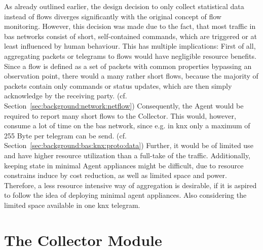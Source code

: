 As already outlined earlier, the design decision to only collect statistical data instead of flows diverges significantly with the original concept of flow monitoring.
However, this decision was made due to the fact, that most traffic in \gls{bas} networks consist of short, self-contained commands, which are triggered or at least influenced by human behaviour. This has multiple implications:
First of all, aggregating packets or telegrams to flows would have negligible resource benefits. Since a flow is defined as a set of packets with common properties bypassing an observation point, there would a many rather short flows, because the majority of packets contain only commands or status updates, which are then simply acknowledge by the receiving party. \parencite[cf.][]{Claise2013} (cf. Section~\ref{sec:background:network:netflow}) 
Consequently, the Agent would be required to report many short flows to the Collector. This would, however, consume a lot of time on the \gls{bas} network, since e.g. in \gls{knx} only a maximum of 255 Byte per telegram can be send. (cf. Section~\ref{sec:background:bas:knx:proto:data})
Further, it would be of limited use and have higher resource utilization than a full-take of the traffic.
Additionally, keeping state in minimal Agent appliances might be difficult, due to resource constrains induce by cost reduction, as well as limited space and power.
Therefore, a less resource intensive way of aggregation is desirable, if it is aspired to follow the idea of deploying minimal agent appliances.
Also considering the limited space available in one \gls{knx} telegram.

\section{The Collector Module}
\label{sec:concept:collector}

